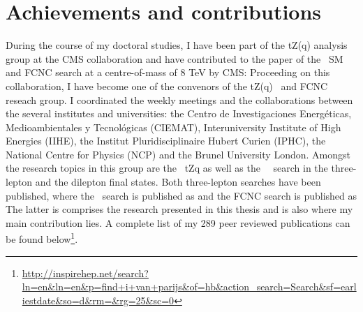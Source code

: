 \chapter*{Achievements and contributions}
During the course of my doctoral studies, I have been part of the tZ(q) analysis group at the CMS collaboration and have contributed to the paper of the \tZq\ SM and FCNC search at a centre-of-mass of 8 TeV by CMS: 
\vspace{+2ex}
\vspace{-2ex}
Proceeding on this collaboration, I have become one of the convenors of the tZ(q) \SM\ and FCNC reseach group. I coordinated the weekly meetings and the collaborations between the several institutes and universities: the Centro de Investigaciones Energ\'eticas, Medioambientales y Tecnol\'ogicas (CIEMAT), Interuniversity Institute of High Energies (IIHE), the Institut Pluridisciplinaire Hubert Curien (IPHC), the National Centre for Physics (NCP) and the Brunel University London. Amongst the research topics in this group are the \SM\ tZq as well as the \FCNC\ \tZq\ search in the three-lepton and the dilepton final states. Both three-lepton searches have been published, where the \SM\ search is published as
\vspace{+2ex}
\vspace{-2ex}
and the FCNC search is published as
\vspace{+2ex}
\vspace{-2ex}
The latter is comprises the research presented in this thesis and is also where my main contribution lies. A complete list of my 289 peer reviewed publications can be found below\footnote{\url{http://inspirehep.net/search?ln=en&ln=en&p=find+i+van+parijs&of=hb&action_search=Search&sf=earliestdate&so=d&rm=&rg=25&sc=0}}.

